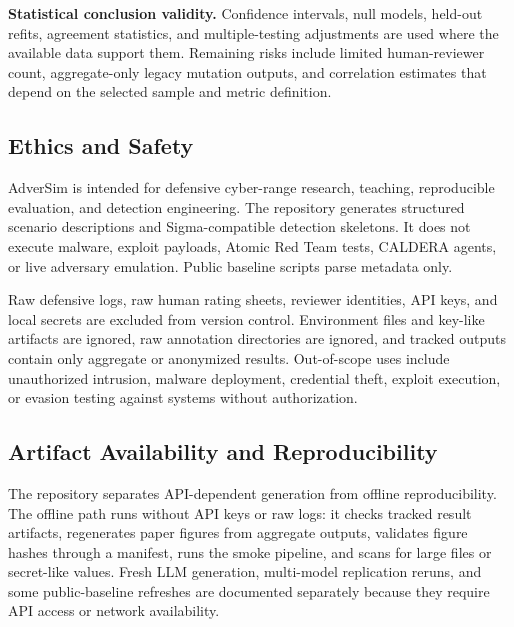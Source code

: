 \textbf{Statistical conclusion validity.}
Confidence intervals, null models, held-out refits, agreement statistics, and
multiple-testing adjustments are used where the available data support them.
Remaining risks include limited human-reviewer count, aggregate-only legacy
mutation outputs, and correlation estimates that depend on the selected sample
and metric definition.

\subsection{Ethics and Safety}

AdverSim is intended for defensive cyber-range research, teaching,
reproducible evaluation, and detection engineering. The repository generates
structured scenario descriptions and Sigma-compatible detection skeletons. It
does not execute malware, exploit payloads, Atomic Red Team tests, CALDERA
agents, or live adversary emulation. Public baseline scripts parse metadata
only.

Raw defensive logs, raw human rating sheets, reviewer identities, API keys, and
local secrets are excluded from version control. Environment files and key-like
artifacts are ignored, raw annotation directories are ignored, and tracked
outputs contain only aggregate or anonymized results. Out-of-scope uses include
unauthorized intrusion, malware deployment, credential theft, exploit execution,
or evasion testing against systems without authorization.

\subsection{Artifact Availability and Reproducibility}

The repository separates API-dependent generation from offline
reproducibility. The offline path runs without API keys or raw logs: it checks
tracked result artifacts, regenerates paper figures from aggregate outputs,
validates figure hashes through a manifest, runs the smoke pipeline, and scans
for large files or secret-like values. Fresh LLM generation, multi-model
replication reruns, and some public-baseline refreshes are documented separately
because they require API access or network availability.

